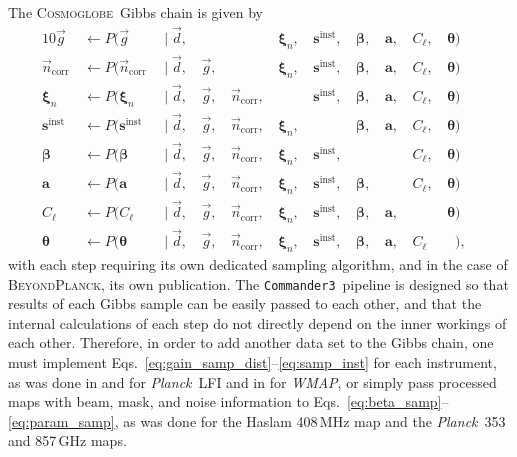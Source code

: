 \documentclass[twocolumn]{../../common/aa}
\def\WMAP{\emph{WMAP}}
\def\Planck{\emph{Planck}}
\def\commanderthree{\texttt{Commander3}}
\renewcommand{\d}[0]{\vec{d}}
\newcommand{\g}[0]{\vec{g}}
\newcommand{\bp}{\textsc{BeyondPlanck}}
\newcommand{\cosmoglobe}{\textsc{Cosmoglobe}}
\newcommand{\ncorr}{\vec n_\mathrm{corr}}
\begin{document}
The \cosmoglobe\ Gibbs chain is given by
\begin{alignat}{10}
\label{eq:gain_samp_dist}\g &\,\leftarrow          P(\g&\,               \mid \d, &\,    &          &\,\boldsymbol\xi_n,  &\,\boldsymbol s^\mathrm{inst}, &\,\boldsymbol\beta, &\,\boldsymbol a, &\,C_{\ell},&\,\boldsymbol\theta)\\
\label{eq:ncorr_samp_dist} \ncorr &\,\leftarrow    P(\ncorr&\,           \mid \d, &\,\g, &\,        &\,\boldsymbol\xi_n,  &\,\boldsymbol s^\mathrm{inst}, &\,\boldsymbol\beta, &\,\boldsymbol a, &\,C_{\ell},&\,\boldsymbol\theta)\\ 
\label{eq:xi_samp_dist} \boldsymbol\xi_n &\,\leftarrow        P(\boldsymbol\xi_n&\,            \mid \d, &\,\g, &\,\ncorr, &\,        &\,\boldsymbol s^\mathrm{inst}, &\,\boldsymbol\beta, &\,\boldsymbol a, &\,C_{\ell},&\,\boldsymbol\theta)\\
\label{eq:samp_inst}\boldsymbol s^\mathrm{inst} &\,\leftarrow                                 P(\boldsymbol s^\mathrm{inst}&\,             \mid \d, &\,\g, &\,\ncorr, &\,\boldsymbol\xi_n,  &\,      &\,\boldsymbol\beta, &\,\boldsymbol a, &\,C_{\ell},&\,\boldsymbol\theta)\\
\label{eq:beta_samp}\boldsymbol\beta &\,\leftarrow                     P(\boldsymbol\beta&\, \mid \d, &\,\g, &\,\ncorr, &\,\boldsymbol\xi_n,  &\,\boldsymbol s^\mathrm{inst}, &\,       &\,    &\,C_{\ell},&\,\boldsymbol\theta)\\
\boldsymbol a &\,\leftarrow                                   P(\boldsymbol a&\,               \mid \d, &\,\g, &\,\ncorr, &\,\boldsymbol\xi_n,  &\,\boldsymbol s^\mathrm{inst}, &\,\boldsymbol\beta, &\,    &\,C_{\ell},&\,\boldsymbol\theta)\\
C_{\ell} &\,\leftarrow                             P(C_{\ell}&\,         \mid \d, &\,\g, &\,\ncorr, &\,\boldsymbol\xi_n,  &\,\boldsymbol s^\mathrm{inst}, &\,\boldsymbol\beta, &\,\boldsymbol a,&\,\phantom{C_{\ell}}&\,\boldsymbol\theta)&\label{eq:cl_sampling}\\
\boldsymbol\theta &\,\leftarrow                             P(\boldsymbol\theta&\,         \mid \d, &\,\g, &\,\ncorr, &\,\boldsymbol\xi_n,  &\,\boldsymbol s^\mathrm{inst}, &\,\boldsymbol\beta, &\,\boldsymbol a,&\,C_\ell\phantom{,}&\phantom{\,\boldsymbol\theta})\label{eq:param_samp},
\end{alignat}
with each step requiring its own dedicated sampling algorithm, and in the case of \bp, its own publication. The \commanderthree\ pipeline is designed so that results of each Gibbs sample can be easily passed to each other, and that the internal calculations of each step do not directly depend on the inner workings of each other. Therefore, in order to add another data set to the Gibbs chain, one must implement Eqs.~\eqref{eq:gain_samp_dist}--\eqref{eq:samp_inst} for each instrument, as was done in \citet{bp01} and \citet{bp10} for \Planck\ LFI and in \citet{bp17} for \WMAP, or simply pass processed maps with beam, mask, and noise information to Eqs.~\eqref{eq:beta_samp}--\eqref{eq:param_samp}, as was done for the Haslam 408\,MHz map \citep{haslam1982,remazeilles2014} and the \Planck\ 353 and 857\,GHz maps.
\end{document}

